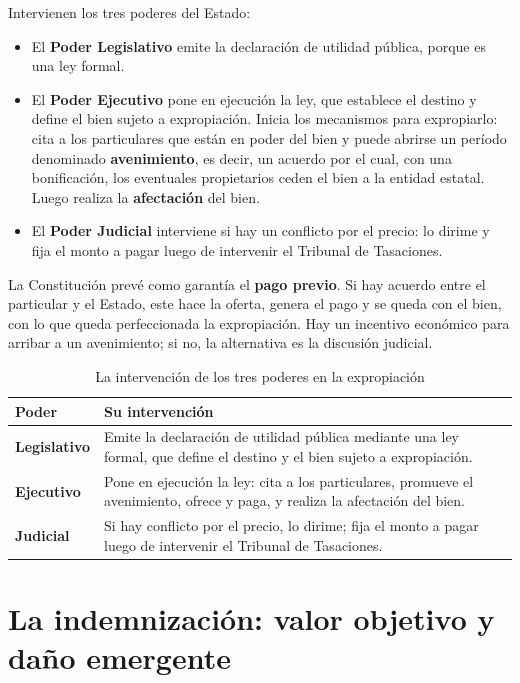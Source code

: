 \documentclass[12pt,oneside]{book}
\begin{document}
Intervienen los tres poderes del Estado:

\begin{itemize}
    \item El \textbf{Poder Legislativo} emite la declaración de utilidad pública, porque es una ley formal.
    \item El \textbf{Poder Ejecutivo} pone en ejecución la ley, que establece el destino y define el bien sujeto a expropiación. Inicia los mecanismos para expropiarlo: cita a los particulares que están en poder del bien y puede abrirse un período denominado \textbf{avenimiento}, es decir, un acuerdo por el cual, con una bonificación, los eventuales propietarios ceden el bien a la entidad estatal. Luego realiza la \textbf{afectación} del bien.
    \item El \textbf{Poder Judicial} interviene si hay un conflicto por el precio: lo dirime y fija el monto a pagar luego de intervenir el Tribunal de Tasaciones.
\end{itemize}

La Constitución prevé como garantía el \textbf{pago previo}. Si hay acuerdo entre el particular y el Estado, este hace la oferta, genera el pago y se queda con el bien, con lo que queda perfeccionada la expropiación. Hay un incentivo económico para arribar a un avenimiento; si no, la alternativa es la discusión judicial.

\begin{table}[H]
\centering
\caption{La intervención de los tres poderes en la expropiación}
\renewcommand{\arraystretch}{1.25}
\begin{tabularx}{\textwidth}{>{\raggedright\arraybackslash}p{} >{\raggedright\arraybackslash}X}
\toprule
\textbf{Poder} & \textbf{Su intervención} \\
\midrule
\textbf{Legislativo} & Emite la declaración de utilidad pública mediante una ley formal, que define el destino y el bien sujeto a expropiación. \\
\textbf{Ejecutivo} & Pone en ejecución la ley: cita a los particulares, promueve el avenimiento, ofrece y paga, y realiza la afectación del bien. \\
\textbf{Judicial} & Si hay conflicto por el precio, lo dirime; fija el monto a pagar luego de intervenir el Tribunal de Tasaciones. \\
\bottomrule
\end{tabularx}
\end{table}

\section{La indemnización: valor objetivo y daño emergente}
\end{document}
